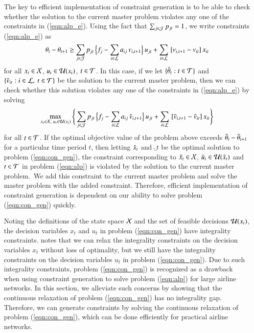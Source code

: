 The key to efficient implementation of constraint generation is to be able to check whether the solution to the current master problem violates any one of the constraints in (\ref{eqn:alp_e}). Using the fact that $\sum_{j \in {\cal J}} p_{jt} =1$, we write constraints (\ref{eqn:alp_e}) as 
%
%
$$
\theta_t - \theta_{t+1} \geq \sum_{j \in {\cal J}} p_{jt} {\,} \Big\{ f_j - \sum_{i \in {\cal L}} a_{ij} {\,} v_{i,t+1} \Big\} {\,} u_{jt} + \sum_{i \in {\cal L}} {\,} [ v_{i,t+1} - v_{it} ] {\,} x_{it} 
$$
%
%
for all $x_t \in {\cal X}$, $u_t \in {\cal U}(x_t)$, $t \in {\cal T}$. In this case, if we let   $\{ {\tilde \theta}_t : t \in {\cal T}\}$ and $\{ {\tilde v}_{it} : i \in {\cal L},~ t \in {\cal T}\}$ be the solution to the current master problem, then we can check whether this solution violates any one of the constraints in (\ref{eqn:alp_e}) by solving 
%
%
\begin{align}
\max_{x_t \in {\cal X},~ u_t \in {\cal U}(x_t)} 
\Bigg\{
\sum_{j \in {\cal J}} p_{jt} {\,} \Big\{ f_j - \sum_{i \in {\cal L}} a_{ij} {\,} {\tilde v}_{i,t+1} \Big\} {\,} u_{jt}
+
\sum_{i \in {\cal L}} {\,} [ {\tilde v}_{i,t+1} - {\tilde v}_{it} ] {\,} x_{it}
\Bigg\}
\label{eqn:con_gen}
\end{align}
%
%
for all $t \in {\cal T}$. If the optimal objective value of the problem above exceeds ${\tilde \theta}_t - {\tilde \theta}_{t+1}$ for a particular time period $t$, then letting ${\tilde x}_t$ and $\utilde_t$ be the optimal solution to problem (\ref{eqn:con_gen}), the constraint corresponding to ${\tilde x}_t \in {\cal X}$, ${\tilde u}_t \in {\cal U}({\tilde x}_t)$ and $t \in {\cal T}$ in problem (\ref{eqn:alp}) is violated by the solution to the current master problem.~We add this constraint to the current master problem and solve the master problem with the added constraint. Therefore, efficient implementation of constraint generation is dependent on our ability to solve problem (\ref{eqn:con_gen}) quickly.


Noting the definitions of the state space ${\cal X}$ and the set of feasible decisions ${\cal U}(x_t)$, the decision variables $x_t$ and $u_t$ in problem (\ref{eqn:con_gen}) have integrality constraints.  notes that we can relax the integrality constraints on the decision variables $x_t$ without loss of optimality, but we still have the integrality constraints on the decision variables $u_t$ in problem (\ref{eqn:con_gen}). Due to such integrality constraints, problem (\ref{eqn:con_gen}) is recognized as a drawback when using constraint generation to solve problem (\ref{eqn:alp}) for large airline networks.  In this section, we alleviate such concerns by showing that the continuous relaxation of problem (\ref{eqn:con_gen}) has no integrality gap. Therefore, we can generate constraints by solving the continuous relaxation of problem (\ref{eqn:con_gen}), which can be done efficiently for practical airline networks. 


